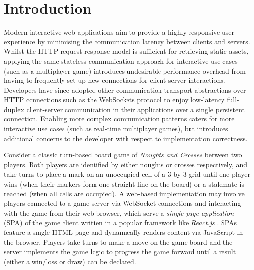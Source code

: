 \documentclass[12pt,twoside]{report}
\begin{document}



\tableofcontents


\chapter{Introduction}

Modern interactive web applications aim to provide a highly responsive user experience by minimising the communication latency between clients and servers. 
Whilst the HTTP request-response model is sufficient for retrieving static assets, applying the same stateless communication approach for interactive use cases (such as a multiplayer game) introduces undesirable performance overhead from having to frequently set up new connections for client-server interactions. 
Developers have since adopted other communication transport abstractions over HTTP connections such as the WebSockets protocol \cite{WebSocketRFC} to enjoy low-latency full-duplex client-server communication in their applications over a single persistent connection. 
Enabling more complex communication patterns caters for more interactive use cases (such as real-time multiplayer games), but introduces additional concerns to the developer with respect to implementation correctness.

Consider a classic turn-based board game of \textit{Noughts and Crosses} between two players. Both players are identified by either noughts or crosses respectively, and take turns to place a mark on an unoccupied cell of a 3-by-3 grid until one player wins (when their markers form one straight line on the board) or a stalemate is reached (when all cells are occupied). A web-based implementation may involve players connected to a game server via WebSocket connections and interacting with the game from their web browser, which serve a \textit{single-page application} (SPA) of the game client written in a popular framework like \textit{React.js} \cite{React}. SPAs feature a single HTML page and dynamically renders content via JavaScript in the browser. Players take turns to make a move on the game board and the server implements the game logic to progress the game forward until a result (either a win/loss or draw) can be declared. 
\end{document}
